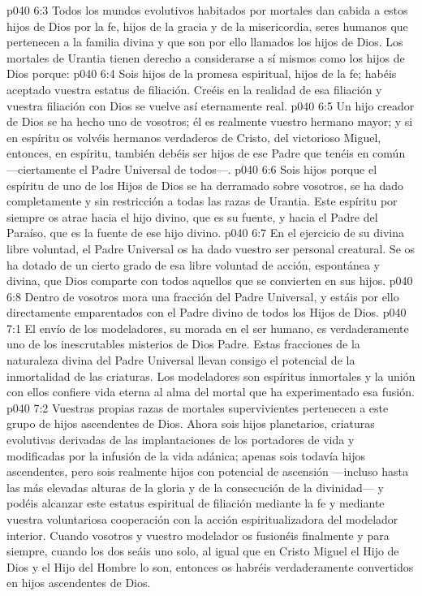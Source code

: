 \vs p040 6:3 Todos los mundos evolutivos habitados por mortales dan cabida a estos hijos de Dios por la fe, hijos de la gracia y de la misericordia, seres humanos que pertenecen a la familia divina y que son por ello llamados los hijos de Dios. Los mortales de Urantia tienen derecho a considerarse a sí mismos como los hijos de Dios porque:
\vs p040 6:4 Sois hijos de la promesa espiritual, hijos de la fe; habéis aceptado vuestra estatus de filiación. Creéis en la realidad de esa filiación y vuestra filiación con Dios se vuelve así eternamente real.
\vs p040 6:5 Un hijo creador de Dios se ha hecho uno de vosotros; él es realmente vuestro hermano mayor; y si en espíritu os volvéis hermanos verdaderos de Cristo, del victorioso Miguel, entonces, en espíritu, también debéis ser hijos de ese Padre que tenéis en común ---ciertamente el Padre Universal de todos---.
\vs p040 6:6 Sois hijos porque el espíritu de uno de los Hijos de Dios se ha derramado sobre vosotros, se ha dado completamente y sin restricción a todas las razas de Urantia. Este espíritu por siempre os atrae hacia el hijo divino, que es su fuente, y hacia el Padre del Paraíso, que es la fuente de ese hijo divino.
\vs p040 6:7 En el ejercicio de su divina libre voluntad, el Padre Universal os ha dado vuestro ser personal creatural. Se os ha dotado de un cierto grado de esa libre voluntad de acción, espontánea y divina, que Dios comparte con todos aquellos que se convierten en sus hijos.
\vs p040 6:8 Dentro de vosotros mora una fracción del Padre Universal, y estáis por ello directamente emparentados con el Padre divino de todos los Hijos de Dios.
\vs p040 7:1 El envío de los modeladores, su morada en el ser humano, es verdaderamente uno de los inescrutables misterios de Dios Padre. Estas fracciones de la naturaleza divina del Padre Universal llevan consigo el potencial de la inmortalidad de las criaturas. Los modeladores son espíritus inmortales y la unión con ellos confiere vida eterna al alma del mortal que ha experimentado esa fusión.
\vs p040 7:2 Vuestras propias razas de mortales supervivientes pertenecen a este grupo de hijos ascendentes de Dios. Ahora sois hijos planetarios, criaturas evolutivas derivadas de las implantaciones de los portadores de vida y modificadas por la infusión de la vida adánica; apenas sois todavía hijos ascendentes, pero sois realmente hijos con potencial de ascensión ---incluso hasta las más elevadas alturas de la gloria y de la consecución de la divinidad--- y podéis alcanzar este estatus espiritual de filiación mediante la fe y mediante vuestra voluntariosa cooperación con la acción espiritualizadora del modelador interior. Cuando vosotros y vuestro modelador os fusionéis finalmente y para siempre, cuando los dos seáis uno solo, al igual que en Cristo Miguel el Hijo de Dios y el Hijo del Hombre lo son, entonces os habréis verdaderamente convertidos en hijos ascendentes de Dios.
